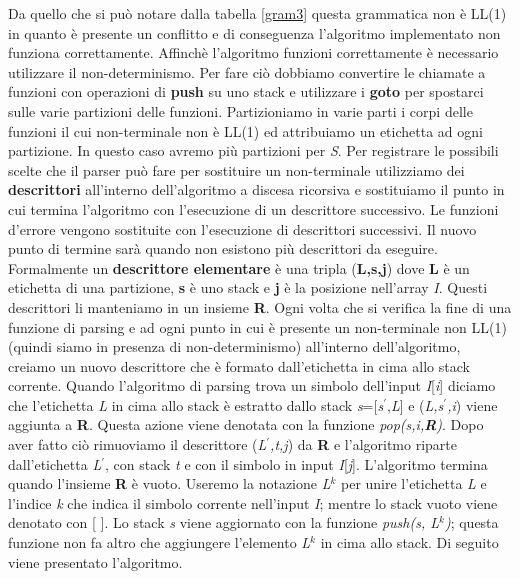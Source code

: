 Da quello che si può notare dalla tabella \ref{gram3} questa grammatica non è LL(1) in quanto è presente un conflitto e di conseguenza l'algoritmo implementato non funziona correttamente. Affinchè l'algoritmo funzioni correttamente è necessario utilizzare il non-determinismo. Per fare ciò dobbiamo convertire le chiamate a funzioni con operazioni di \textbf{push} su uno stack e utilizzare i \textbf{goto} per spostarci sulle varie partizioni delle funzioni. Partizioniamo in varie parti i corpi delle funzioni il cui non-terminale non è LL(1) ed attribuiamo un etichetta ad ogni partizione. In questo caso avremo più partizioni per \textit{S}. Per registrare le possibili scelte che il parser può fare per sostituire un non-terminale utilizziamo dei \textbf{descrittori} all'interno dell'algoritmo a discesa ricorsiva e sostituiamo il punto in cui termina l'algoritmo con l'esecuzione di un descrittore successivo. Le funzioni d'errore vengono sostituite con l'esecuzione di descrittori successivi. Il nuovo punto di termine sarà quando non esistono più descrittori da eseguire. Formalmente un \textbf{descrittore elementare} è una tripla (\textbf{L,s,j}) dove \textbf{L} è un etichetta di una partizione, \textbf{s} è uno stack e \textbf{j} è la posizione nell'array \textit{I}. Questi descrittori li manteniamo in un insieme \textbf{R}. Ogni volta che si verifica la fine di una funzione di parsing e ad ogni punto in cui è presente un non-terminale non LL(1) (quindi siamo in presenza di non-determinismo) all'interno dell'algoritmo, creiamo un nuovo descrittore che è formato dall'etichetta in cima allo stack corrente. Quando l'algoritmo di parsing trova un simbolo dell'input \textit{I}[\textit{i}] diciamo che l'etichetta \textit{L} in cima allo stack è estratto dallo stack \textit{s}=[\textit{s$^{'}$},\textit{L}] e (\textit{L,s$^{'}$,i}) viene aggiunta a \textbf{R}. Questa azione viene denotata con la funzione \textit{pop(s,i,\textbf{R})}. Dopo aver fatto ciò rimuoviamo il descrittore (\textit{L$^{'}$,t,j}) da \textbf{R} e l'algoritmo riparte dall'etichetta \textit{L$^{'}$}, con stack \textit{t} e con il simbolo in input \textit{I}[\textit{j}]. L'algoritmo termina quando l'insieme \textbf{R} è vuoto. Useremo la notazione \textit{L}$^{k}$ per unire l'etichetta \textit{L} e l'indice \textit{k} che indica il simbolo corrente nell'input \textit{I}; mentre lo stack vuoto viene denotato con [ ]. Lo stack \textit{s} viene aggiornato con la funzione \textit{push(s, L$^{k}$)}; questa funzione non fa altro che aggiungere  l'elemento \textit{L}$^{k}$ in cima allo stack. Di seguito viene presentato l'algoritmo.\par
